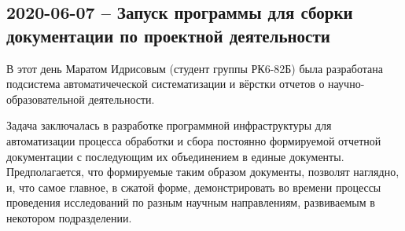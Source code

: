 \subsection{2020-06-07 -- Запуск программы для сборки документации по проектной деятельности}

В этот день Маратом Идрисовым (студент группы РК6-82Б) была разработана подсистема автоматичеческой систематизации и вёрстки отчетов о 
научно-образовательной деятельности. 

Задача заключалась в разработке программной инфраструктуры для автоматизации процесса обработки и сбора постоянно формируемой отчетной документации с последующим их объединением в единые документы. Предполагается, что формируемые таким образом документы, позволят наглядно, и, что самое главное, в сжатой форме, демонстрировать во времени процессы проведения исследований по разным научным направлениям, развиваемым в некотором подразделении.

		
